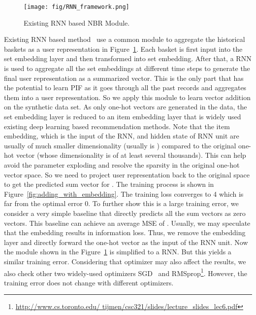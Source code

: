 \documentclass[sigconf]{acmart}
\begin{document}
\begin{figure}[!t]
\centerline{\texttt{[image: fig/RNN\_framework.png]}}
\caption{Existing RNN based NBR Module.}
\label{fig:RNN_framework}
\end{figure}

Existing RNN based method~\cite{hu2019sets2sets}\cite{yu2016dynamic} use a common  module to aggregate the historical baskets as a user representation in  Figure~\ref{fig:RNN_framework}.  Each basket is first input into the set embedding layer and then  transformed into set embedding. After that, a RNN is used to aggregate  all the set  embeddings at different time steps to  generate the final  user representation as a  summarized vector. This is the only part that has the potential to learn PIF as  it goes through all the past records and aggregates them into a user  representation. So we apply this module to learn vector addition on the synthetic data set. As only one-hot vectors are generated  in the data,  the set embedding  layer is reduced to an item embedding layer that is widely used existing deep learning based recommendation methods.  Note that the item embedding,  which is the input of the RNN,  and hidden state of RNN unit are usually of much smaller dimensionality  (usually is ) compared to the original one-hot vector (whose dimensionality is of  at least several thousands). This can help avoid the   parameter exploding and resolve the sparsity in the original one-hot vector space. So we  need to  project user  representation back to the original space to get the  predicted sum vector for  . The training process is shown in  Figure~\ref{fig:adding_with_embedding}. The training loss converges to 4 which is far from the optimal error 0. To further show  this is a large  training error, we consider a very simple baseline that  directly predicts all the sum vectors as zero vectors. This baseline can  achieve an average MSE of  .  Usually, we may  speculate that the  embedding results in information loss. Thus, we remove the  embedding layer and directly forward the one-hot vector as the input of the RNN unit. Now the module shown in the  Figure~\ref{fig:RNN_framework} is simplified to a RNN. But this yields a similar  training error. Considering that optimizer may also affect the results,  we also check other two  widely-used  optimizers  SGD~\cite{bottou2010large} and RMSprop\footnote{\url{http://www.cs.toronto.edu/ tijmen/csc321/slides/lecture\_slides\_lec6.pdf}
}. However, the training  error does not change with different  optimizers. 
\end{document}
